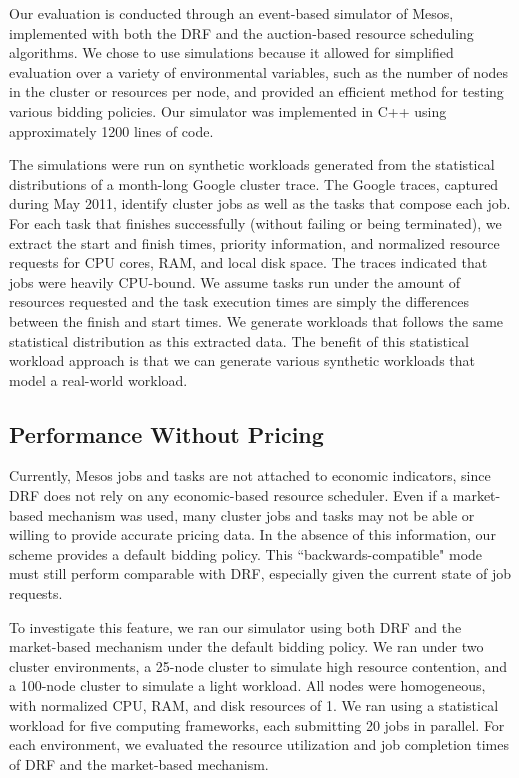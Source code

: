 \documentclass{acm_proc_article-sp}
\begin{document}
Our evaluation is conducted through an event-based simulator of Mesos, implemented with both the DRF and the auction-based resource scheduling algorithms. We chose to use simulations because it allowed for simplified evaluation over a variety of environmental variables, such as the number of nodes in the cluster or resources per node, and provided an efficient method for testing various bidding policies. Our simulator was implemented in C++ using approximately 1200 lines of code.

The simulations were run on synthetic workloads generated from the statistical distributions of a month-long Google cluster trace. The Google traces, captured during May 2011, identify cluster jobs as well as the tasks that compose each job. For each task that finishes successfully (without failing or being terminated), we extract the start and finish times, priority information, and normalized resource requests for CPU cores, RAM, and local disk space. The traces indicated that jobs were heavily CPU-bound. We assume tasks run under the amount of resources requested and the task execution times are simply the differences between the finish and start times. We generate workloads that follows the same statistical distribution as this extracted data. The benefit of this statistical workload approach is that we can generate various synthetic workloads that model a real-world workload.

\subsection{Performance Without Pricing\\}

Currently, Mesos jobs and tasks are not attached to economic indicators, since DRF does not rely on any economic-based resource scheduler. Even if a market-based mechanism was used, many cluster jobs and tasks may not be able or willing to provide accurate pricing data. In the absence of this information, our scheme provides a default bidding policy. This ``backwards-compatible" mode must still perform comparable with DRF, especially given the current state of job requests.

To investigate this feature, we ran our simulator using both DRF and the market-based mechanism under the default bidding policy. We ran under two cluster environments, a 25-node cluster to simulate high resource contention, and a 100-node cluster to simulate a light workload. All nodes were homogeneous, with normalized CPU, RAM, and disk resources of 1. We ran using a statistical workload for five computing frameworks, each submitting 20 jobs in parallel. For each environment, we evaluated the resource utilization and job completion times of DRF and the market-based mechanism.
\end{document}
